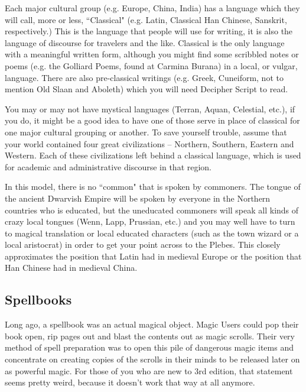 Each major cultural group (e.g. Europe, China, India) has a language which they will call, more or less, ``Classical" (e.g. Latin, Classical Han Chinese, Sanskrit, respectively.) This is the language that people will use for writing, it is also the language of discourse for travelers and the like. Classical is the only language with a meaningful written form, although you might find some scribbled notes or poems (e.g. the Golliard Poems, found at Carmina Burana) in a local, or vulgar, language. There are also pre-classical writings (e.g. Greek, Cuneiform, not to mention Old Slaan and Aboleth) which you will need Decipher Script to read.

You may or may not have mystical languages (Terran, Aquan, Celestial, etc.), if you do, it might be a good idea to have one of those serve in place of classical for one major cultural grouping or another. To save yourself trouble, assume that your world contained four great civilizations -- Northern, Southern, Eastern and Western. Each of these civilizations left behind a classical language, which is used for academic and administrative discourse in that region.

In this model, there is no ``common" that is spoken by commoners. The tongue of the ancient Dwarvish Empire will be spoken by everyone in the Northern countries who is educated, but the uneducated commoners will speak all kinds of crazy local tongues (Wenn, Lapp, Prussian, etc.) and you may well have to turn to magical translation or local educated characters (such as the town wizard or a local aristocrat) in order to get your point across to the Plebes. This closely approximates the position that Latin had in medieval Europe or the position that Han Chinese had in medieval China.

\subsection{Spellbooks}
\vspace*{-8pt}

Long ago, a spellbook was an actual magical object. Magic Users could pop their book open, rip pages out and blast the contents out as magic scrolls. Their very method of spell preparation was to open this pile of dangerous magic items and concentrate on creating copies of the scrolls in their minds to be released later on as powerful magic. For those of you who are new to 3rd edition, that statement seems pretty weird, because it doesn't work that way at all anymore.

